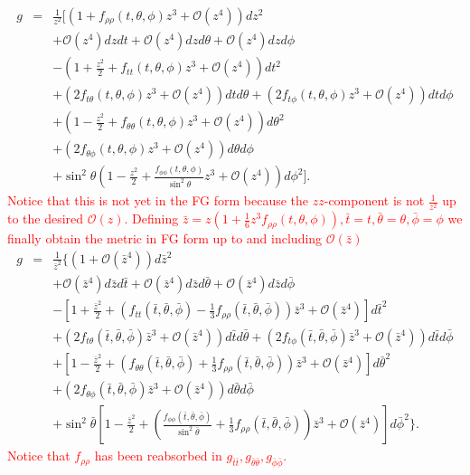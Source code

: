 \documentclass[a4paper,11pt]{article}
\begin{document}
\begin{eqnarray}
g&=&\frac{1}{z^2}\biggl[ 
\left(1+f_{\rho\rho}(t,\theta,\phi)z^3+\mathcal{O}(z^4)\right)dz^2 \nonumber \\
&&+\mathcal{O}(z^4) dz dt+\mathcal{O}(z^4) dz d\theta+\mathcal{O}(z^4) dz d\phi \nonumber \\
&&- \left(1+\frac{z^2}{2}+f_{tt}(t,\theta,\phi)z^3 +\mathcal{O}(z^4)\right)dt^2 \nonumber \\
&&+ \left(2 f_{t\theta}(t,\theta,\phi)z^3+\mathcal{O}(z^4)\right)dt d\theta + \left(2 f_{t\phi}(t,\theta,\phi) z^3+\mathcal{O}(z^4)\right)dt d\phi  \nonumber \\
&&+  \left(1-\frac{z^2}{2}+f_{\theta\theta}(t,\theta,\phi)z^3 +\mathcal{O}(z^4)\right)d\theta^2 \nonumber \\
&&+ \left(2 f_{\theta\phi}(t,\theta,\phi) z^3+\mathcal{O}(z^4)\right)d\theta d\phi \nonumber\\
&&+  \sin^2\theta \left(1-\frac{z^2}{2}+\frac{f_{\phi\phi}(t,\theta,\phi)}{\sin^2\theta} z^3 +\mathcal{O}(z^4)\right)d\phi^2
\biggr].
\end{eqnarray}
\textcolor{red}{Notice that this is not yet in the FG form because the $zz$-component is not $\frac{1}{z^2}$ up to the desired $\mathcal{O}(z)$. Defining $\bar{z}=z\left(1+\frac{1}{6}z^3f_{\rho\rho}(t,\theta,\phi)\right),\bar{t}=t,\bar{\theta}=\theta,\bar{\phi}=\phi$ we finally obtain the metric in FG form up to and including $\mathcal{O}(\bar{z})$}
\begin{eqnarray}
g&=&\frac{1}{\bar{z}^2}\biggl\{ 
\left(1+\mathcal{O}(\bar{z}^4)\right)d\bar{z}^2 \nonumber \\
&&+\mathcal{O}(\bar{z}^4) d\bar{z} d\bar{t}+\mathcal{O}(\bar{z}^4) d\bar{z} d\bar{\theta}+\mathcal{O}(\bar{z}^4) d\bar{z} d\bar{\phi} \nonumber \\
&&- \left[1+\frac{\bar{z}^2}{2}+\left(f_{tt}(\bar{t},\bar{\theta},\bar{\phi})-\frac{1}{3}f_{\rho\rho}(\bar{t},\bar{\theta},\bar{\phi})\right)\bar{z}^3 +\mathcal{O}(\bar{z}^4)\right]d\bar{t}^2 \nonumber \\
&&+ \left(2 f_{t\theta}(\bar{t},\bar{\theta},\bar{\phi})\bar{z}^3+\mathcal{O}(\bar{z}^4)\right)d\bar{t} d\bar{\theta} + \left(2 f_{t\phi}(\bar{t},\bar{\theta},\bar{\phi}) \bar{z}^3+\mathcal{O}(\bar{z}^4)\right)d\bar{t} d\bar{\phi}  \nonumber \\
&&+  \left[1-\frac{\bar{z}^2}{2}+\left(f_{\theta\theta}(\bar{t},\bar{\theta},\bar{\phi})+\frac{1}{3}f_{\rho\rho}(\bar{t},\bar{\theta},\bar{\phi})\right)\bar{z}^3 +\mathcal{O}(\bar{z}^4)\right]d\bar{\theta}^2 \nonumber \\
&&+ \left(2 f_{\theta\phi}(\bar{t},\bar{\theta},\bar{\phi}) \bar{z}^3+\mathcal{O}(\bar{z}^4)\right)d\bar{\theta} d\bar{\phi} \nonumber\\
&&+   \sin^2\bar{\theta} \left[1-\frac{\bar{z}^2}{2}+\left(\frac{f_{\phi\phi}(\bar{t},\bar{\theta},\bar{\phi})}{ \sin^2\bar{\theta}}+\frac{1}{3}f_{\rho\rho}(\bar{t},\bar{\theta},\bar{\phi})\right)\bar{z}^3 +\mathcal{O}(\bar{z}^4)\right]d\bar{\phi}^2
\biggr\}.
\end{eqnarray}
\textcolor{red}{Notice that $f_{\rho\rho}$ has been reabsorbed in $g_{\bar{t}\bar{t}},g_{\bar{\theta}\bar{\theta}},g_{\bar{\phi}\bar{\phi}}$.}
\end{document}
